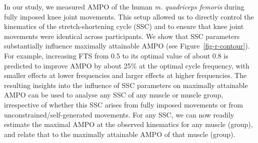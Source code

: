 \documentclass[
  11pt,
  a4paper]{article}
\begin{document}
In our study, we measured AMPO of the human \emph{m. quadriceps femoris}
during fully imposed knee joint movements. This setup allowed us to
directly control the kinematics of the stretch-shortening cycle (SSC)
and to ensure that knee joint movements were identical across
participants. We show that SSC parameters substantially influence
maximally attainable AMPO (see Figure~\ref{fig-r-contour}). For example,
increasing FTS from 0.5 to its optimal value of about 0.8 is predicted
to improve AMPO by about 25\% at the optimal cycle frequency, with
smaller effects at lower frequencies and larger effects at higher
frequencies. The resulting insights into the influence of SSC parameters
on maximally attainable AMPO can be used to analyse any SSC of any
muscle or muscle group, irrespective of whether this SSC arises from
fully imposed movements or from unconstrained/self-generated movements.
For any SSC, we can now readily estimate the maximal AMPO at the
observed kinematics for any muscle (group), and relate that to the
maximally attainable AMPO of that muscle (group).
\end{document}
